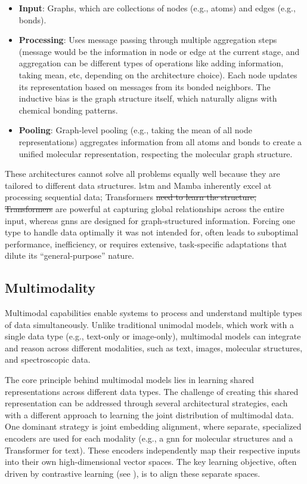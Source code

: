 \documentclass[11pt, oneside]{article}
\makeatletter
\providecommand{\DIFdeltex}[1]{{\protect\color{red}\sout{#1}}} %
\providecommand{\DIFdelbegin}{} %
\providecommand{\DIFdelend}{} %
\providecommand{\DIFdel}[1]{\texorpdfstring{\DIFdeltex{#1}}{}} %
\newcommand{\DIFscaledelfig}{0.5}
\newlength{\DIFdelgraphicswidth} %
\newlength{\DIFdelgraphicsheight} %
\newcommand{\DIFdelincludegraphics}[2][]{%
\sbox{\DIFdelgraphicsbox}{\DIFOincludegraphics[#1]{#2}}%
\settoboxwidth{\DIFdelgraphicswidth}{\DIFdelgraphicsbox} %
\settoboxtotalheight{\DIFdelgraphicsheight}{\DIFdelgraphicsbox} %
\scalebox{\DIFscaledelfig}{%
\parbox[b]{\DIFdelgraphicswidth}{\usebox{\DIFdelgraphicsbox}\\[-\baselineskip] \rule{\DIFdelgraphicswidth}{0em}}\llap{\resizebox{\DIFdelgraphicswidth}{\DIFdelgraphicsheight}{%
\setlength{\unitlength}{\DIFdelgraphicswidth}%
\begin{picture}(1,1)%
\thicklines\linethickness{2pt} %
{\color[rgb]{1,0,0}\put(0,0){\framebox(1,1){}}}%
{\color[rgb]{1,0,0}\put(0,0){\line( 1,1){1}}}%
{\color[rgb]{1,0,0}\put(0,1){\line(1,-1){1}}}%
\end{picture}%
}\hspace*{3pt}}} %
} %
\DeclareRobustCommand{\DIFdelbegin}{\DIFOdelbegin \let\includegraphics\DIFdelincludegraphics} %
\DeclareRobustCommand{\DIFdelend}{\DIFOaddend \let\includegraphics\DIFOincludegraphics} %
\let\sout@orig\sout %
\renewcommand{\sout}[1]{\ifmmode\text{\sout@orig{\ensuremath{#1}}}\else\sout@orig{#1}\fi} %
\makeatother
\begin{document}
\begin{itemize}
    \item \textbf{Input}: Graphs, which are collections of nodes (e.g., atoms) and edges (e.g., bonds).
    \item \textbf{Processing}: Uses message passing through multiple aggregation steps (message would be the information in node or edge at the current stage, and aggregation can be different types of operations like adding information, taking mean, etc, depending on the architecture choice). Each node updates its representation based on messages from its bonded neighbors. The inductive bias is the graph structure itself, which naturally aligns with chemical bonding patterns.
    \item \textbf{Pooling}: Graph-level pooling (e.g., taking the mean of all node representations) aggregates information from all atoms and bonds to create a unified molecular representation, respecting the molecular graph structure.
\end{itemize}

\noindent These architectures cannot solve all problems equally well because they are tailored to different data structures. 
\gls{lstm} and Mamba inherently excel at processing sequential data; Transformers \DIFdelbegin \DIFdel{need to learn the structure, Transformers }\DIFdelend are powerful at capturing global relationships across the entire input,
whereas \glspl{gnn} are designed for graph-structured information. 
Forcing one type to handle data optimally it was not intended for, often leads to suboptimal performance, inefficiency, or requires extensive, task-specific adaptations that dilute its \enquote{general-purpose} nature.\autocite{alampara2024mattext}


\subsection{Multimodality}
\DIFdelbegin %

\DIFdelend Multimodal capabilities enable systems to process and understand multiple types of data simultaneously. 
Unlike traditional unimodal models, which work with a single data type (e.g., text-only or image-only), multimodal models can integrate and reason across different modalities, such as text, images, molecular structures, and spectroscopic data.

The core principle behind multimodal models lies in learning shared representations across different data types.  The challenge of creating this shared representation can be addressed through several architectural strategies, each with a different approach to learning the joint distribution of multimodal data. One dominant strategy is joint embedding alignment, where separate, specialized encoders are used for each modality (e.g., a \gls{gnn} for molecular structures and a Transformer for text). These encoders independently map their respective inputs into their own high-dimensional vector spaces. 
The key learning objective, often driven by contrastive learning (see ), is to align these separate spaces. 
\end{document}

